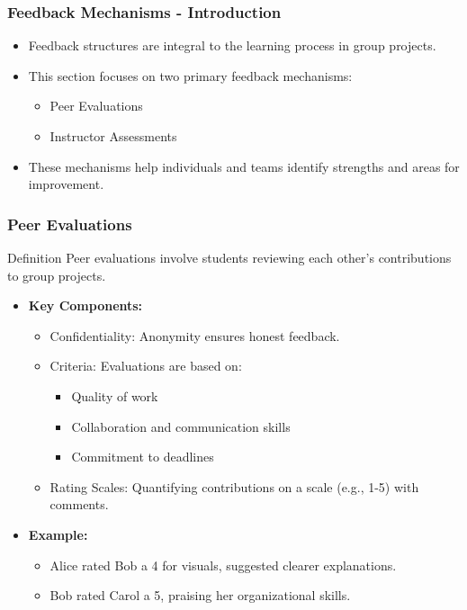\documentclass{beamer}
\begin{document}
\begin{frame}[fragile]
    \frametitle{Feedback Mechanisms - Introduction}
    \begin{itemize}
        \item Feedback structures are integral to the learning process in group projects.
        \item This section focuses on two primary feedback mechanisms: 
        \begin{itemize}
            \item Peer Evaluations
            \item Instructor Assessments
        \end{itemize}
        \item These mechanisms help individuals and teams identify strengths and areas for improvement.
    \end{itemize}
\end{frame}

\begin{frame}[fragile]
    \frametitle{Peer Evaluations}
    \begin{block}{Definition}
        Peer evaluations involve students reviewing each other's contributions to group projects.
    \end{block}
    \begin{itemize}
        \item \textbf{Key Components:}
        \begin{itemize}
            \item Confidentiality: Anonymity ensures honest feedback.
            \item Criteria: Evaluations are based on:
            \begin{itemize}
                \item Quality of work
                \item Collaboration and communication skills
                \item Commitment to deadlines
            \end{itemize}
            \item Rating Scales: Quantifying contributions on a scale (e.g., 1-5) with comments.
        \end{itemize}
        \item \textbf{Example:} 
        \begin{itemize}
            \item Alice rated Bob a 4 for visuals, suggested clearer explanations.
            \item Bob rated Carol a 5, praising her organizational skills.
        \end{itemize}
    \end{itemize}
\end{frame}
\end{document}
